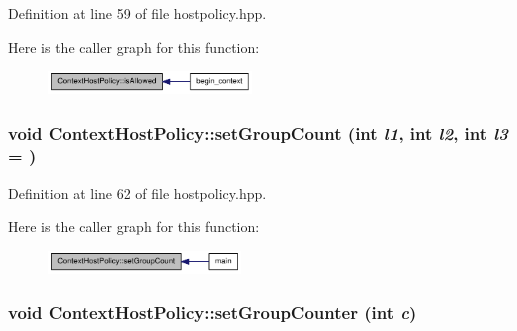 Definition at line 59 of file hostpolicy.hpp.

Here is the caller graph for this function:\nopagebreak
\begin{figure}[H]
\begin{center}
\leavevmode
\includegraphics[width=153pt]{class_context_host_policy_ada4604e88c103b12a8d2a2a8c533dada_icgraph}
\end{center}
\end{figure}
\hypertarget{class_context_host_policy_a46740f08a26323e21734995fa08c4c0c}{
\subsubsection[{setGroupCount}]{\setlength{\rightskip}{0pt plus 5cm}void ContextHostPolicy::setGroupCount (int {\em l1}, \/  int {\em l2}, \/  int {\em l3} = {})}}
\label{class_context_host_policy_a46740f08a26323e21734995fa08c4c0c}


Definition at line 62 of file hostpolicy.hpp.

Here is the caller graph for this function:\nopagebreak
\begin{figure}[H]
\begin{center}
\leavevmode
\includegraphics[width=145pt]{class_context_host_policy_a46740f08a26323e21734995fa08c4c0c_icgraph}
\end{center}
\end{figure}
\hypertarget{class_context_host_policy_a7705f176010456efe3dfed9cbb351e2b}{
\subsubsection[{setGroupCounter}]{\setlength{\rightskip}{0pt plus 5cm}void ContextHostPolicy::setGroupCounter (int {\em c})}}
\label{class_context_host_policy_a7705f176010456efe3dfed9cbb351e2b}


